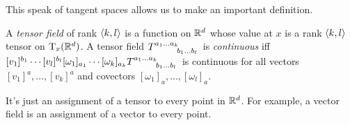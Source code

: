 This speak of tangent spaces allows us to make an important definition.
\begin{dfn}\label{TensorField}
A \emph{tensor field} of rank $\coord{k,l}$ is a function on $\R ^d$ whose value at $x$ is a rank $\coord{k,l}$ tensor on $\tangent{\R ^d}{x}$.  A tensor field $T\indices{^{a_1\ldots a_k}_{b_1\ldots b_l}}$ is \emph{continuous} iff $[v_1]^{b_1}\cdots [v_l]^{b_l}[\omega _1]_{a_1}\cdots [\omega _k]_{a_k}T\indices{^{a_1\ldots a_k}_{b_1\ldots b_l}}$ is continuous for all vectors $[v_1]^a,\ldots ,[v_k]^a$ and covectors $[\omega _1]_a,\ldots ,[\omega _l]_a$.
\begin{rmk}
It's just an assignment of a tensor to every point in $\R ^d$.  For example, a vector field is an assignment of a vector to every point.
\end{rmk}
\end{dfn}

